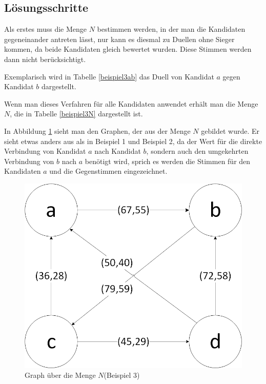 \subsection{Lösungsschritte} 
\label{sec:loesungen3}
Als erstes muss die Menge $N$ bestimmen werden, in der man die Kandidaten gegeneinander antreten lässt, nur kann es diesmal zu Duellen ohne Sieger kommen, da beide Kandidaten gleich bewertet wurden. Diese Stimmen werden dann nicht berücksichtigt. 

Exemplarisch wird in Tabelle \ref{beispiel3ab} das Duell von Kandidat $a$ gegen Kandidat $b$ dargestellt. 




Wenn man dieses Verfahren für alle Kandidaten anwendet erhält man die Menge $N$, die in Tabelle \ref{beispiel3N} dargestellt ist.



In Abbildung \ref{fig:graph3} sieht man den Graphen, der aus der Menge $N$ gebildet wurde. Er sieht etwas anders aus als in Beispiel 1 und Beispiel 2, da der Wert für die direkte Verbindung von Kandidat $a$ nach Kandidat $b$, sondern auch den umgekehrten Verbindung von $b$ nach $a$ benötigt wird, sprich es werden die Stimmen für den Kandidaten $a$ und die Gegenstimmen eingezeichnet. 

\begin{figure}[!h]
\centering
\includegraphics[scale=0.5]{Bilder/Beispiel3_Graph.png}
\caption{Graph über die Menge $N$(Beispiel 3)}
\label{fig:graph3}
\end{figure}

